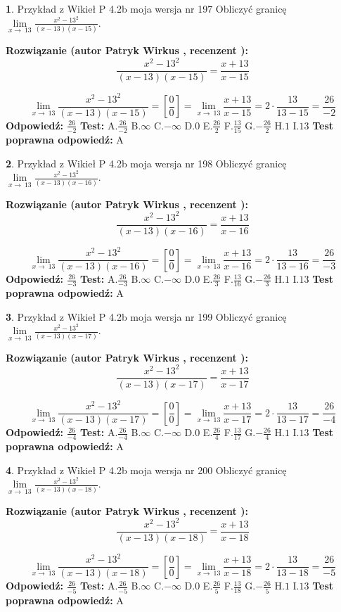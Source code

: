 \documentclass[12pt, a4paper]{article}
\theoremstyle{definition} %
\newtheorem{zad}{}
\newcommand{\zadStart}[1]{\begin{zad}#1\newline}
\newcommand{\zadStop}{\end{zad}}
\newcommand{\rozwStart}[2]{\noindent \textbf{Rozwiązanie (autor #1 , recenzent #2): }\newline}
\newcommand{\rozwStop}{\newline}
\newcommand{\odpStart}{\noindent \textbf{Odpowiedź:}\newline}
\newcommand{\odpStop}{\newline}
\newcommand{\testStart}{\noindent \textbf{Test:}\newline}
\newcommand{\testStop}{\newline}
\newcommand{\kluczStart}{\noindent \textbf{Test poprawna odpowiedź:}\newline}
\newcommand{\kluczStop}{\newline}
\begin{document}
\zadStart{Przykład z Wikieł P 4.2b moja wersja nr 197}
Obliczyć granicę $\lim\limits_{x\to\ 13}\frac{x^{2}-13^{2}}{(x-13)(x-15)}$.
\zadStop
\rozwStart{Patryk Wirkus}{}
$$\frac{x^{2}-13^{2}}{(x-13)(x-15)}=\frac{x+13}{x-15}$$

$$\lim\limits_{x\to\ 13}\frac{x^{2}-13^{2}}{(x-13)(x-15)}=[\frac{0}{0}]=\lim\limits_{x\to\ 13}\frac{x+13}{x-15}=2 \cdot \frac{13}{13-15} = \frac{26}{-2}$$
\rozwStop
\odpStart
$\frac{26}{-2}$
\odpStop
\testStart
A.$\frac{26}{-2}$
B.$\infty$
C.$-\infty$
D.$0$
E.$\frac{26}{2}$
F.$\frac{13}{15}$
G.$-\frac{26}{2}$
H.$1$
I.$13$
\testStop
\kluczStart
A
\kluczStop



\zadStart{Przykład z Wikieł P 4.2b moja wersja nr 198}
Obliczyć granicę $\lim\limits_{x\to\ 13}\frac{x^{2}-13^{2}}{(x-13)(x-16)}$.
\zadStop
\rozwStart{Patryk Wirkus}{}
$$\frac{x^{2}-13^{2}}{(x-13)(x-16)}=\frac{x+13}{x-16}$$

$$\lim\limits_{x\to\ 13}\frac{x^{2}-13^{2}}{(x-13)(x-16)}=[\frac{0}{0}]=\lim\limits_{x\to\ 13}\frac{x+13}{x-16}=2 \cdot \frac{13}{13-16} = \frac{26}{-3}$$
\rozwStop
\odpStart
$\frac{26}{-3}$
\odpStop
\testStart
A.$\frac{26}{-3}$
B.$\infty$
C.$-\infty$
D.$0$
E.$\frac{26}{3}$
F.$\frac{13}{16}$
G.$-\frac{26}{3}$
H.$1$
I.$13$
\testStop
\kluczStart
A
\kluczStop



\zadStart{Przykład z Wikieł P 4.2b moja wersja nr 199}
Obliczyć granicę $\lim\limits_{x\to\ 13}\frac{x^{2}-13^{2}}{(x-13)(x-17)}$.
\zadStop
\rozwStart{Patryk Wirkus}{}
$$\frac{x^{2}-13^{2}}{(x-13)(x-17)}=\frac{x+13}{x-17}$$

$$\lim\limits_{x\to\ 13}\frac{x^{2}-13^{2}}{(x-13)(x-17)}=[\frac{0}{0}]=\lim\limits_{x\to\ 13}\frac{x+13}{x-17}=2 \cdot \frac{13}{13-17} = \frac{26}{-4}$$
\rozwStop
\odpStart
$\frac{26}{-4}$
\odpStop
\testStart
A.$\frac{26}{-4}$
B.$\infty$
C.$-\infty$
D.$0$
E.$\frac{26}{4}$
F.$\frac{13}{17}$
G.$-\frac{26}{4}$
H.$1$
I.$13$
\testStop
\kluczStart
A
\kluczStop



\zadStart{Przykład z Wikieł P 4.2b moja wersja nr 200}
Obliczyć granicę $\lim\limits_{x\to\ 13}\frac{x^{2}-13^{2}}{(x-13)(x-18)}$.
\zadStop
\rozwStart{Patryk Wirkus}{}
$$\frac{x^{2}-13^{2}}{(x-13)(x-18)}=\frac{x+13}{x-18}$$

$$\lim\limits_{x\to\ 13}\frac{x^{2}-13^{2}}{(x-13)(x-18)}=[\frac{0}{0}]=\lim\limits_{x\to\ 13}\frac{x+13}{x-18}=2 \cdot \frac{13}{13-18} = \frac{26}{-5}$$
\rozwStop
\odpStart
$\frac{26}{-5}$
\odpStop
\testStart
A.$\frac{26}{-5}$
B.$\infty$
C.$-\infty$
D.$0$
E.$\frac{26}{5}$
F.$\frac{13}{18}$
G.$-\frac{26}{5}$
H.$1$
I.$13$
\testStop
\kluczStart
A
\kluczStop
\end{document}
